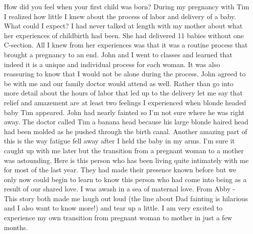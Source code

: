 How did you feel when your first child was born?
During my pregnancy with Tim I realized how little I knew about the process of labor and delivery of a baby. What could I expect? I had never talked at length with my mother about what her experiences of childbirth had been. She had delivered 11 babies without one C-section. All I knew from her experiences was that it was a routine process that brought a pregnancy to an end. John and I went to classes and learned that indeed it is a unique and individual process for each woman. It was also reassuring to know that I would not be alone during the process. John agreed to be with me and our family doctor would attend as well. 
Rather than go into more detail about the hours of labor that led up to the delivery let me say that relief and amazement are at least two feelings I experienced when blonde headed baby Tim appeared. John had nearly fainted so I'm not sure where he was right away. The doctor called Tim a banana head because his large blonde haired head had been molded as he pushed through the birth canal. Another amazing part of this is the way fatigue fell away after I held the baby in my arms. I'm sure it caught up with me later but the transition from a pregnant woman to a mother was astounding. Here is this person who has been living quite intimately with me for most of the last year. They had made their presence known before but we only now could begin to learn to know this person who had come into being as a result of our shared love. I was awash in a sea of maternal love.
From Abby - This story both made me laugh out loud (the line about Dad fainting is hilarious and I also want to know more!) and tear up a little. I am very excited to experience my own transition from pregnant woman to mother in just a few months.




